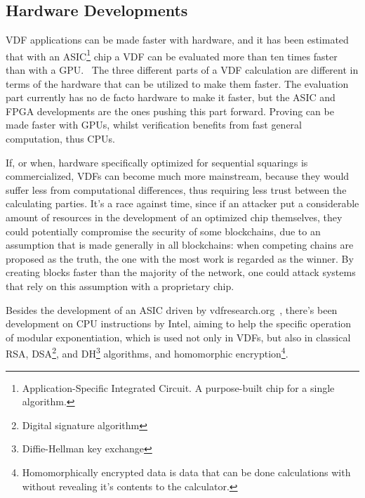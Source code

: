 \subsection{Hardware Developments}
VDF applications can be made faster with hardware, and it has been estimated that with an ASIC\footnote{Application-Specific Integrated Circuit. A purpose-built chip for a single algorithm.} chip a VDF can be evaluated more than ten times faster than with a GPU.~\cite{Stanford_Video2020-ap}
The three different parts of a VDF calculation are different in terms of the hardware that can be utilized to make them faster. The evaluation part currently has no de facto hardware to make it faster, but the ASIC and FPGA developments are the ones pushing this part forward. Proving can be made faster with GPUs, whilst verification benefits from fast general computation, thus CPUs.\cite{Protocol_Labs_Kelly_Olson2020-au}

If, or when, hardware specifically optimized for sequential squarings is commercialized, VDFs can become much more mainstream, because they would suffer less from computational differences, thus requiring less trust between the calculating parties. It's a race against time, since if an attacker put a considerable amount of resources in the development of an optimized chip themselves, they could potentially compromise the security of some blockchains, due to an assumption that is made generally in all blockchains: when competing chains are proposed as the truth, the one with the most work is regarded as the winner. By creating blocks faster than the majority of the network, one could attack systems that rely on this assumption with a proprietary chip.

Besides the development of an ASIC driven by vdfresearch.org~\cite{noauthor_undated-hk}, there's been development on CPU instructions by Intel, aiming to help the specific operation of modular exponentiation, which is used not only in VDFs, but also in classical RSA, DSA\footnote{Digital signature algorithm}, and DH\footnote{Diffie-Hellman key exchange} algorithms, and homomorphic encryption\footnote{Homomorphically encrypted data is data that can be done calculations with without revealing it's contents to the calculator.}.~\cite{Drucker2019-cx}
